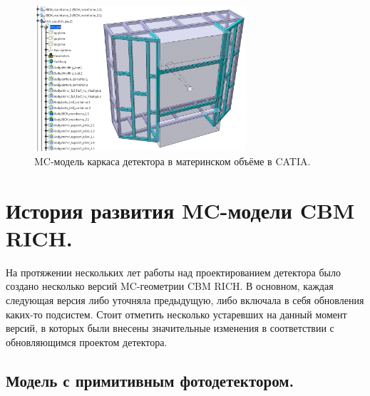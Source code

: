 \begin{figure}[H]
\centering
\includegraphics[width=0.7\textwidth]{pictures/Mainframe.png}
\caption{MC-модель каркаса детектора в материнском объёме в CATIA.}
\label{fig:geoMainframe}
\end{figure}

%                                                                          

\section{История развития MC-модели CBM RICH.}\label{sec:secRICHgeoHistory}

На протяжении нескольких лет работы над проектированием детектора было создано несколько версий MC-геометрии CBM RICH. В основном, каждая следующая версия либо уточняла предыдущую, либо включала в себя обновления каких-то подсистем. Стоит отметить несколько устаревших на данный момент версий, в которых были внесены значительные изменения в соответствии с обновляющимся проектом детектора.

\subsection{Модель с примитивным фотодетектором.}\label{sec:secPrimitiveCamera}

